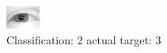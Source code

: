 \begin{figure}[h!]
\begin{center}
\includegraphics[width=0.60\columnwidth]{figures/ID2398_class_2_target_3.png}
\end{center}
\caption{ Classification: 2 actual target: 3}
\label{fig:ID2398_class_2_target_3}
\end{figure}
